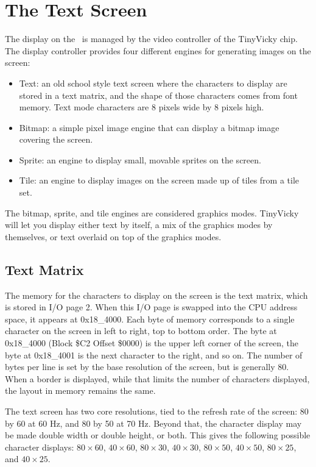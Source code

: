 \chapter{The Text Screen}

The display on the \jr\ is managed by the video controller of the TinyVicky chip. The display controller provides four different engines for generating images on the screen:

\begin{itemize}
    \item Text: an old school style text screen where the characters to display are stored in a text matrix, and the shape of those characters comes from font memory. Text mode characters are 8 pixels wide by 8 pixels high.
    \item Bitmap: a simple pixel image engine that can display a bitmap image covering the screen.
    \item Sprite: an engine to display small, movable sprites on the screen.
    \item Tile: an engine to display images on the screen made up of tiles from a tile set.
\end{itemize}

The bitmap, sprite, and tile engines are considered graphics modes. TinyVicky will let you display either text by itself, a mix of the graphics modes by themselves, or text overlaid on top of the graphics modes.

\section*{Text Matrix}

The memory for the characters to display on the screen is the text matrix, which is stored in I/O page 2. When this I/O page is swapped into the CPU address space, it appears at 0x18\_4000. Each byte of memory corresponds to a single character on the screen in left to right, top to bottom order. The byte at 0x18\_4000 (Block \$C2 Offset \$0000) is the upper left corner of the screen, the byte at 0x18\_4001 is the next character to the right, and so on. The number of bytes per line is set by the base resolution of the screen, but is generally 80. When a border is displayed, while that limits the number of characters displayed, the layout in memory remains the same.

The text screen has two core resolutions, tied to the refresh rate of the screen: 80 by 60 at 60 Hz, and 80 by 50 at 70 Hz. Beyond that, the character display may be made double width or double height, or both. This gives the following possible character displays: $80 \times 60$, $40 \times 60$, $80 \times 30$, $40 \times 30$, $80 \times 50$, $40 \times 50$, $80 \times 25$, and $40 \times 25$.


